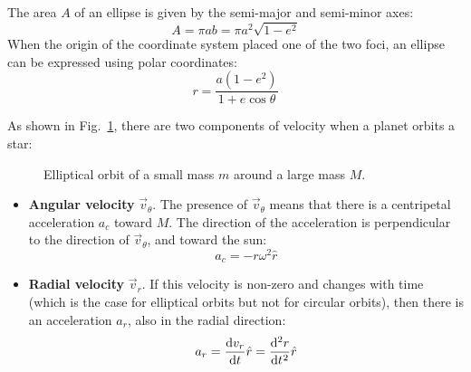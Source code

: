 \documentclass{../../oss-handout}
\begin{document}
The area $A$ of an ellipse is given by the semi-major and semi-minor axes:
\begin{equation}
  A=\pi ab=\pi a^2\sqrt{1-e^2}
  \label{A2}
\end{equation}
When the origin of the coordinate system placed one of the two foci, an ellipse
can be expressed using polar coordinates:
\begin{equation}
  r=\frac{a(1-e^2)}{1+e\cos\theta}
  \label{ellipse-eq}
\end{equation}

As shown in Fig.~\ref{eorbit}, there are two components of velocity when a
planet orbits a star:
\begin{figure}[!ht]
  \centering
  \caption{Elliptical orbit of a small mass $m$ around a large mass $M$.}
  \label{eorbit}
\end{figure}
\begin{itemize}
\item\textbf{Angular velocity} $\vec v_\theta$. The presence of
  $\vec v_\theta$ means that there is a centripetal acceleration $a_c$ toward
  $M$. The direction of the acceleration is perpendicular to the direction of
  $\vec v_\theta$, and toward the sun:
  \begin{equation}
    a_c=-r\omega^2\hat r
  \end{equation}
\item\textbf{Radial velocity} $\vec v_r$. If this velocity is non-zero and
  changes with time (which is the case for elliptical orbits but not for
  circular orbits), then there is an acceleration $a_r$, also in the radial
  direction:
  \begin{equation}
    a_r=\diff{v_r}t\hat r=\diff[2]rt\hat r
  \end{equation}
\end{itemize}
\end{document}

